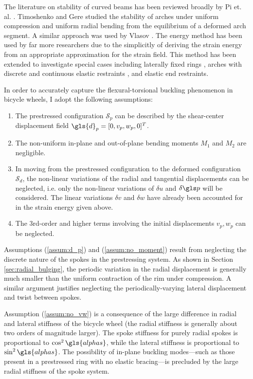 \documentclass[\rootdir/thesis.tex]{subfiles}
\begin{document}
The literature on stability of curved beams has been reviewed broadly by Pi et. al. \cite{Pi2005}. Timoshenko and Gere \cite{Timoshenko1961} studied the stability of arches under uniform compression and uniform radial bending from the equilibrium of a deformed arch segment. A similar approach was used by Vlasov \cite{Vlasov1961}. The energy method has been used by far more researchers \cite{Yoo1982,Trahair1987,Pi1992,Kang1994,Pi1995,Lim2004,Ryu2012} due to the simplicitly of deriving the strain energy from an appropriate approximation for the strain field. This method has been extended to investigate special cases including laterally fixed rings \cite{Teng1988b}, arches with discrete and continuous elastic restraints \cite{Pi2002,Bradford2002}, and elastic end restraints.

In order to accurately capture the flexural-torsional buckling phenomenon in bicycle wheels, I adopt the following assumptions:
\begin{enumerate}
	\item{The prestressed configuration $\mathcal{S}_p$ can be described by the shear-center displacement field $\gls{d}_p = [0, v_p, w_p, 0]^T$.}\label{assum:d_p}
	\item{The non-uniform in-plane and out-of-plane bending moments $M_1$ and $M_2$ are negligible.}\label{assum:no_moment}
	\item{In moving from the prestressed configuration to the deformed configuration $\mathcal{S}_d$, the non-linear variations of the radial and tangential displacements can be neglected, i.e. only the non-linear variations of $\delta u$ and $\delta\p$ will be considered. The linear variations $\delta v$ and $\delta w$ have already been accounted for in the strain energy given above.}\label{assum:no_vw}
	\item{The 3rd-order and higher terms involving the initial displacements $v_p,w_p$ can be neglected.}\label{assum:no_prebuckle}
\end{enumerate}

Assumptions (\ref{assum:d_p}) and (\ref{assum:no_moment}) result from neglecting the discrete nature of the spokes in the prestressing system. As shown in Section \ref{sec:radial_bulging}, the periodic variation in the radial displacement is generally much smaller than the uniform contraction of the rim under compression. A similar argument justifies neglecting the periodically-varying lateral displacement and twist between spokes.

Assumption (\ref{assum:no_vw}) is a consequence of the large difference in radial and lateral stiffness of the bicycle wheel (the radial stiffness is generally about two orders of magnitude larger). The spoke stiffness for purely radial spokes is proportional to $\cos^2{\gls{alphas}}$, while the lateral stiffness is proportional to $\sin^2{\gls{alphas}}$. The possibility of in-plane buckling modes---such as those present in a prestressed ring with no elastic bracing---is precluded by the large radial stiffness of the spoke system.
\end{document}
